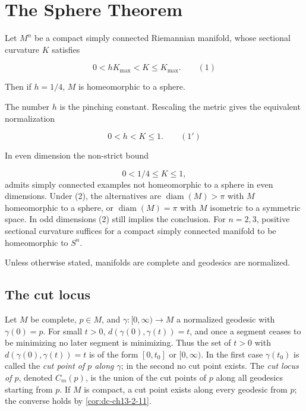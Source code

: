 \chapter{The Sphere Theorem}
\label{chap:dc-sphere-theorem}

\begin{theorem}
  \label{thm:dc-ch13-1-1}
  Let $M^n$ be a compact simply connected Riemannian manifold, whose sectional
  curvature $K$ satisfies
  
  $$
  0<hK_{\max}<K\leq K_{\max}.\qquad(1)
  $$
  
  Then if $h=1/4$, $M$ is homeomorphic to a sphere.
  
  The number $h$ is the pinching constant. Rescaling the metric gives the equivalent
  normalization
  
  $$
  0<h<K\leq 1.\qquad(1')
  $$
  
  In even dimension the non-strict bound
  
  $$
  0<1/4\leq K\leq1,\tag{2}
  $$
  admits simply connected examples not homeomorphic to a sphere in even dimensions.
  Under (2), the alternatives are $\operatorname{diam}(M)>\pi$ with $M$ homeomorphic
  to a sphere, or $\operatorname{diam}(M)=\pi$ with $M$ isometric to a symmetric
  space. In odd dimensions (2) still implies the conclusion. For $n=2,3$, positive
  sectional curvature suffices for a compact simply connected manifold to be
  homeomorphic to $S^n$.
  
  Unless otherwise stated, manifolds are complete and geodesics are normalized.
\end{theorem}

\section{The cut locus}

Let $M$ be complete, $p\in M$, and $\gamma:[0,\infty)\to M$ a normalized geodesic
with $\gamma(0)=p$. For small $t>0$, $d(\gamma(0),\gamma(t))=t$, and once a segment
ceases to be minimizing no later segment is minimizing. Thus the set of $t>0$ with
$d(\gamma(0),\gamma(t))=t$ is of the form $[0,t_0]$ or $[0,\infty)$. In the first
case $\gamma(t_0)$ is called the \emph{cut point of $p$ along $\gamma$}; in the second
no cut point exists. The \emph{cut locus of $p$}, denoted $C_m(p)$, is the union of the
cut points of $p$ along all geodesics starting from $p$. If $M$ is compact, a cut
point exists along every geodesic from $p$; the converse holds by
\cref{cor:dc-ch13-2-11}.

